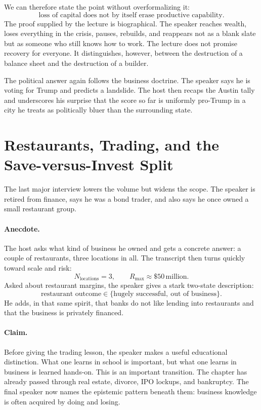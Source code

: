 We can therefore state the point without overformalizing it:
\begin{equation}
\text{loss of capital does not by itself erase productive capability.}
\end{equation}
The proof supplied by the lecture is biographical. The speaker reaches wealth, loses everything in the crisis, pauses, rebuilds, and reappears not as a blank slate but as someone who still knows how to work. The lecture does not promise recovery for everyone. It distinguishes, however, between the destruction of a balance sheet and the destruction of a builder.

The political answer again follows the business doctrine. The speaker says he is voting for Trump and predicts a landslide. The host then recaps the Austin tally and underscores his surprise that the score so far is uniformly pro-Trump in a city he treats as politically bluer than the surrounding state.

\section{Restaurants, Trading, and the Save-versus-Invest Split}

The last major interview lowers the volume but widens the scope. The speaker is retired from finance, says he was a bond trader, and also says he once owned a small restaurant group.

\paragraph{Anecdote.}
The host asks what kind of business he owned and gets a concrete answer: a couple of restaurants, three locations in all. The transcript then turns quickly toward scale and risk:
\begin{equation}
N_{\text{locations}} = 3,\qquad
R_{\max} \approx \$50\,\text{million}.
\end{equation}
Asked about restaurant margins, the speaker gives a stark two-state description:
\begin{equation}
\text{restaurant outcome} \in \{\text{hugely successful},\ \text{out of business}\}.
\end{equation}
He adds, in that same spirit, that banks do not like lending into restaurants and that the business is privately financed.

\paragraph{Claim.}
Before giving the trading lesson, the speaker makes a useful educational distinction. What one learns in school is important, but what one learns in business is learned hands-on. This is an important transition. The chapter has already passed through real estate, divorce, IPO lockups, and bankruptcy. The final speaker now names the epistemic pattern beneath them: business knowledge is often acquired by doing and losing.

